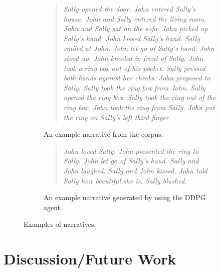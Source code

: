 \documentclass[11pt,letterpaper]{article}
\begin{document}
\begin{figure}[h!]
    \begin{subfigure}[b]{0.5\textwidth}
        \blockquote{
        \textit{
        \small
        Sally opened the door.
        John entered Sally's house.
        John and Sally entered the living room.
        John and Sally sat on the sofa.
        John picked up Sally's hand.
        John kissed Sally's hand.
        Sally smiled at John.
        John let go of Sally's hand.
        John stood up.
        John kneeled in front of Sally.
        John took a ring box out of his pocket.
        Sally pressed both hands against her cheeks.
        John proposed to Sally.
        Sally took the ring box from John.
        Sally opened the ring box.
        Sally took the ring out of the ring box.
        John took the ring from Sally.
        John put the ring on Sally's left third finger.
        }
        }
        \caption{An example narrative from the corpus.\vspace{0.2in}}
        \label{figure:story_corpus2}
    \end{subfigure}
    \begin{subfigure}[b]{0.5\textwidth}
        \blockquote{
        \textit{
        \small
        John loved Sally.
        John presented the ring to Sally.
        John let go of Sally's hand.
        Sally and John laughed.
        Sally and John kissed.
        John told Sally how beautiful she is.
        Sally blushed.}
        }
        
        \caption{An example narrative generated by using the DDPG agent.}%
        
        \label{figure:story_ddpg}
    \end{subfigure}
    
    \caption{Examples of narratives.}%
    

\end{figure}
\section{Discussion/Future Work}
\end{document}
